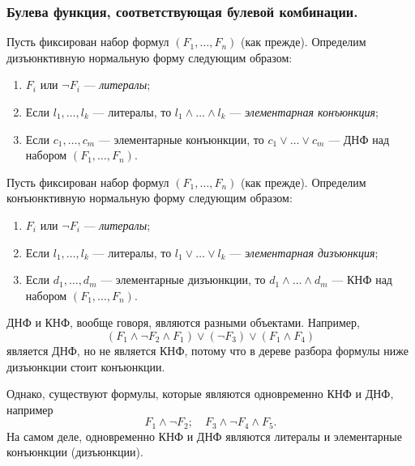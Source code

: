 \documentclass[a4paper, fleqn]{article}
\begin{document}
    \subsubsection{Булева функция, соответствующая булевой комбинации.}

    \begin{definition}
        Пусть фиксирован набор формул $(F_{1}, \ldots, F_{n})$ (как прежде).
        Определим дизъюнктивную нормальную форму следующим образом:
        \begin{enumerate}
            \item $F_{i}$ или $\neg F_{i}$ --- {\it литералы};
            \item Если $l_{1}, \ldots, l_{k}$ --- литералы, то $l_{1} \land \ldots \land  l_{k}$ --- {\it элементарная конъюнкция};
            \item Если $c_{1}, \ldots, c_{m}$ --- элементарные конъюнкции, то $c_{1} \lor \ldots \lor c_{m}$ --- ДНФ над набором $(F_{1}, \ldots, F_{n})$.
        \end{enumerate}
    \end{definition}
    
    \begin{definition}
        Пусть фиксирован набор формул $(F_{1}, \ldots, F_{n})$ (как прежде).
        Определим конъюнктивную нормальную форму следующим образом:
        \begin{enumerate}
            \item $F_{i}$ или $\neg F_{i}$ --- {\it литералы};
            \item Если $l_{1}, \ldots, l_{k}$ --- литералы, то $l_{1} \lor \ldots \lor  l_{k}$ --- {\it элементарная дизъюнкция};
            \item Если $d_{1}, \ldots, d_{m}$ --- элементарные дизъюнкции, то $d_{1} \land \ldots \land d_{m}$ --- КНФ над набором $(F_{1}, \ldots, F_{n})$.
        \end{enumerate}
    \end{definition}
    
    ДНФ и КНФ, вообще говоря, являются разными объектами.
    Например,
    \[
        (F_{1} \land \neg F_{2} \land F_{1}) \lor (\neg F_{3}) \lor (F_{1} \land F_{4})
    \]
    является ДНФ, но не является КНФ, потому что в дереве разбора формулы ниже дизъюнкции стоит конъюнкции.
    
    Однако, существуют формулы, которые являются одновременно КНФ и ДНФ, например
    \[
        F_{1} \land \neg F_{2}; \quad F_{3} \land \neg F_{4} \land F_{5}.
    \]
    На самом деле, одновременно КНФ и ДНФ являются литералы и элементарные конъюнкции (дизъюнкции).
    
\end{document}
